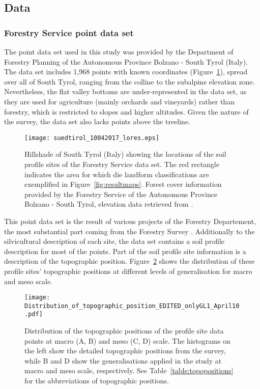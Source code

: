 \documentclass[preprint,12pt,authoryear]{elsarticle}
\begin{document}
\subsection{Data}
\subsubsection{Forestry Service point data set}
The point data set used in this study was provided by the Department of Forestry Planning of the Autonomous Province Bolzano - South Tyrol (Italy).
The data set includes 1,968 points with known coordinates (Figure~\ref{fig:datapoints}), spread over all of South Tyrol, ranging from the colline to the subalpine elevation zone. Nevertheless, the flat valley bottoms are under-represented in the data set, as they are used for agriculture (mainly orchards and vineyards) rather than forestry, which is restricted to slopes and higher altitudes. Given the nature of the survey, the data set also lacks points above the treeline.
\begin{figure}
\texttt{[image: suedtirol\_10042017\_lores.eps]}
\caption{Hillshade of South Tyrol (Italy) showing the locations of the soil profile sites of the Forestry Service data set. The red rectangle indicates the area for which die landform classifications are exemplified in Figure~\ref{fig:resultmaps}. Forest cover information provided by the Forestry Service of the Autonomous Province Bolzano - South Tyrol, elevation data retrieved from \cite{DTM}.}
\label{fig:datapoints}
\end{figure}
 This point data set is the result of  various projects of the Forestry Departement, the most substantial part coming from the Forestry Survey \citep{APB2006}. Additionally to the silvicultural description of each site, the data set contains a soil profile description for most of the points. Part of the soil profile site information is a description of the topographic position. Figure~\ref{fig:hist} shows the distribution of these profile sites' topographic positions at different levels of generalisation for macro and meso scale.

\begin{figure}
\texttt{[image: Distribution\_of\_topographic\_position\_EDITED\_onlyGL1\_April10.pdf]}
\caption{Distribution of the topographic positions of the profile site data points at macro (A, B) and meso (C, D) scale. The histograms on the left show the detailed topographic positions from the survey, while B and D show the generalisations applied in the study at macro and meso scale, respectively. See Table~\ref{table:topopositions} for the abbreviations of topographic positions.}
\label{fig:hist}
\end{figure}
\end{document}
